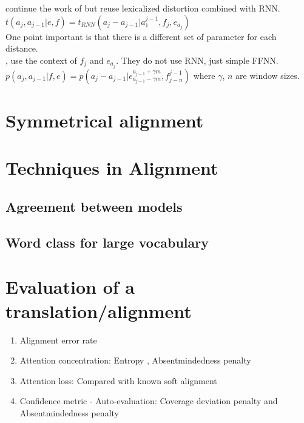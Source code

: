 \documentclass{article}
\begin{document}
\citep{Tamura14recurrent} continue the work of \citep{Yang13word} but reuse lexicalized distortion combined with RNN.
$t(a_{j}, a_{j-1}|e,f) = t_{RNN}(a_{j} - a_{j-1}| a_{1}^{j-1}, f_j, e_{a_j})$\\
One point important is that there is a different set of parameter for each distance.\\

\citep{Alkhouli2016AlignmentBasedNM}, \citep{Wang2017HybridNN} use the context of $f_j$ and $e_{a_j}$. They do not use RNN, just simple FFNN.
$p( a_j, a_{j-1}| f,  e) = p(a_{j} - a_{j-1}| e^{a_{j-1} + \gamma m}_{a_{j-1} - \gamma m}, f_{j-n}^{j-1})$ where $\gamma$, $n$ are window sizes.



\section{Symmetrical alignment}


\section{Techniques in Alignment}
\subsection{Agreement between models}

\subsection{Word class for large vocabulary}


\section{Evaluation of a translation/alignment}
\begin{enumerate}
\item Alignment error rate
\item Attention concentration: Entropy \citep{Ghader2017what}, Absentmindedness penalty \citep{Rikters2017confidence}
\item Attention loss: Compared with known soft alignment
\item Confidence metric - Auto-evaluation: Coverage deviation penalty and Absentmindedness penalty \citep{Rikters2017confidence}

\end{enumerate}
\end{document}
